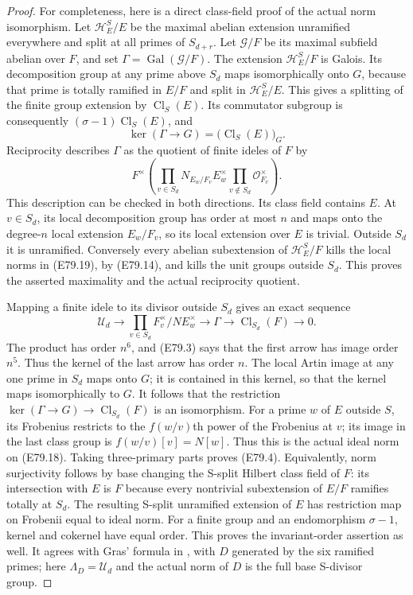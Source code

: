 \begin{proof}
For completeness, here is a direct class-field proof of
the actual norm isomorphism. Let $\mathcal H_E^S/E$ be
the maximal abelian extension unramified everywhere and
split at all primes of $S_{d+r}$. Let $\mathcal G/F$ be
its maximal subfield abelian over $F$, and set
$\Gamma=\operatorname{Gal}(\mathcal G/F)$. The extension
$\mathcal H_E^S/F$ is Galois. Its decomposition group at
any prime above $S_d$ maps isomorphically onto $G$,
because that prime is totally ramified in $E/F$ and
split in $\mathcal H_E^S/E$. This gives a splitting of
the finite group extension by $\operatorname{Cl}_S(E)$.
Its commutator subgroup is consequently
$(\sigma-1)\operatorname{Cl}_S(E)$, and
\[
 \ker(\Gamma\to G)=\bigl(\operatorname{Cl}_S(E)\bigr)_G.
 \tag{E79.18}
\]
Reciprocity describes $\Gamma$ as the quotient of finite
ideles of $F$ by
\[
 F^\times\!\left(\prod_{v\in S_d}N_{E_w/F_v}E_w^\times
                  \prod_{v\notin S_d}\mathcal O_{F_v}^\times\right).
 \tag{E79.19}
\]
This description can be checked in both directions. Its
class field contains $E$. At $v\in S_d$, its local
decomposition group has order at most $n$ and maps onto
the degree-$n$ local extension $E_w/F_v$, so its local
extension over $E$ is trivial. Outside $S_d$ it is
unramified. Conversely every abelian subextension of
$\mathcal H_E^S/F$ kills the local norms in (E79.19),
by (E79.14), and kills the unit groups outside $S_d$.
This proves the asserted maximality and the actual
reciprocity quotient.

Mapping a finite idele to its divisor outside $S_d$
gives an exact sequence
\[
 \mathscr U_d\longrightarrow
 \prod_{v\in S_d}F_v^\times/N E_w^\times
 \longrightarrow\Gamma\longrightarrow
 \operatorname{Cl}_{S_d}(F)\longrightarrow0.
 \tag{E79.20}
\]
The product has order $n^6$, and (E79.3) says that the
first arrow has image order $n^5$. Thus the kernel of
the last arrow has order $n$. The local Artin image
at any one prime in $S_d$ maps onto $G$; it is contained
in this kernel, so that the kernel maps isomorphically
to $G$. It follows that the restriction
$\ker(\Gamma\to G)\to\operatorname{Cl}_{S_d}(F)$ is
an isomorphism. For a prime $w$ of $E$ outside $S$,
its Frobenius restricts to the $f(w/v)$th power of the
Frobenius at $v$; its image in the last class group is
$f(w/v)[v]=N[w]$. Thus this is the actual ideal norm
on (E79.18). Taking three-primary parts proves
(E79.4). Equivalently, norm surjectivity follows by
base changing the S-split Hilbert class field of $F$:
its intersection with $E$ is $F$ because every nontrivial
subextension of $E/F$ ramifies totally at $S_d$. The
resulting S-split unramified extension of $E$ has
restriction map on Frobenii equal to ideal norm.
For a finite group and an endomorphism $\sigma-1$,
kernel and cokernel have equal order. This proves the
invariant-order assertion as well. It agrees with
Gras' formula in \cite[Theorem~2.6]{E_LOXZKummer},
with $D$ generated by the six ramified primes; here
$\Lambda_D=\mathscr U_d$ and the actual norm of $D$
is the full base S-divisor group.


\end{proof}
